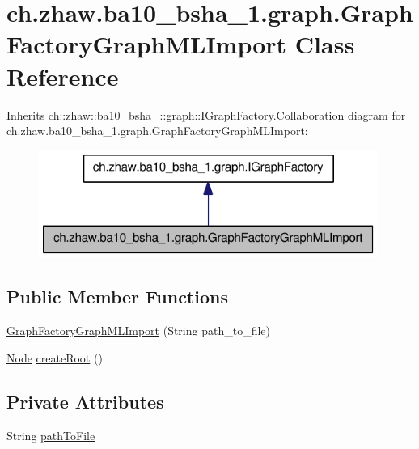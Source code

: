 \hypertarget{classch_1_1zhaw_1_1ba10__bsha__1_1_1graph_1_1GraphFactoryGraphMLImport}{
\section{ch.zhaw.ba10\_\-bsha\_\-1.graph.GraphFactoryGraphMLImport Class Reference}
\label{classch_1_1zhaw_1_1ba10__bsha__1_1_1graph_1_1GraphFactoryGraphMLImport}
}


Inherits \hyperlink{interfacech_1_1zhaw_1_1ba10__bsha__1_1_1graph_1_1IGraphFactory}{ch::zhaw::ba10\_\-bsha\_::graph::IGraphFactory}.Collaboration diagram for ch.zhaw.ba10\_\-bsha\_\-1.graph.GraphFactoryGraphMLImport:\nopagebreak
\begin{figure}[H]
\begin{center}
\leavevmode
\includegraphics[width=314pt]{classch_1_1zhaw_1_1ba10__bsha__1_1_1graph_1_1GraphFactoryGraphMLImport__coll__graph}
\end{center}
\end{figure}
\subsection*{Public Member Functions}
\begin{DoxyCompactItemize}
\item 
\hyperlink{classch_1_1zhaw_1_1ba10__bsha__1_1_1graph_1_1GraphFactoryGraphMLImport_ace03ca9ee48806f41a9a9221c6dec29e}{GraphFactoryGraphMLImport} (String path\_\-to\_\-file)
\item 
\hyperlink{classch_1_1zhaw_1_1ba10__bsha__1_1_1graph_1_1Node}{Node} \hyperlink{classch_1_1zhaw_1_1ba10__bsha__1_1_1graph_1_1GraphFactoryGraphMLImport_a2936d100be1654461056080ff61edd32}{createRoot} ()
\end{DoxyCompactItemize}
\subsection*{Private Attributes}
\begin{DoxyCompactItemize}
\item 
String \hyperlink{classch_1_1zhaw_1_1ba10__bsha__1_1_1graph_1_1GraphFactoryGraphMLImport_a642c45c8a2ca616d6c11d2cc7f971929}{pathToFile}
\end{DoxyCompactItemize}


